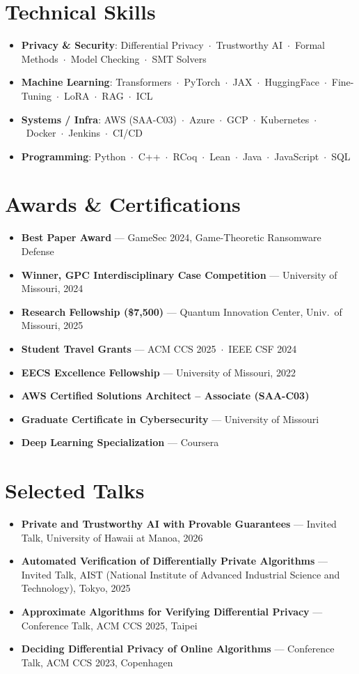 \documentclass[letterpaper,11pt]{article}
\newcommand{\plainListStart}{\begin{itemize}[leftmargin=0.15in, label={\small\textbullet}, itemsep=3pt, parsep=0pt, topsep=2pt]}
\newcommand{\plainListEnd}{\end{itemize}\vspace{1pt}}
\newcommand{\sep}{\ $\cdot$\ }
\begin{document}
\section{Technical Skills}
\plainListStart
  \small
  \item \textbf{Privacy \& Security}: Differential Privacy\sep Trustworthy AI\sep Formal Methods\sep Model Checking\sep SMT Solvers
  \item \textbf{Machine Learning}: Transformers\sep PyTorch\sep JAX\sep HuggingFace\sep Fine-Tuning\sep LoRA\sep RAG\sep ICL
  \item \textbf{Systems / Infra}: AWS (SAA-C03)\sep Azure\sep GCP\sep Kubernetes\sep Docker\sep Jenkins\sep CI/CD
  \item \textbf{Programming}: Python\sep C++\sep RCoq\sep Lean\sep Java\sep JavaScript\sep SQL
\plainListEnd

\section{Awards \& Certifications}
\plainListStart
  \small
  \item \textbf{Best Paper Award} --- GameSec 2024, Game-Theoretic Ransomware Defense
  \item \textbf{Winner, GPC Interdisciplinary Case Competition} --- University of Missouri, 2024
  \item \textbf{Research Fellowship (\$7,500)} --- Quantum Innovation Center, Univ.\ of Missouri, 2025
  \item \textbf{Student Travel Grants} --- ACM CCS 2025\sep IEEE CSF 2024
  \item \textbf{EECS Excellence Fellowship} --- University of Missouri, 2022
  \item \textbf{AWS Certified Solutions Architect -- Associate (SAA-C03)}
  \item \textbf{Graduate Certificate in Cybersecurity} --- University of Missouri
  \item \textbf{Deep Learning Specialization} --- Coursera
\plainListEnd

\section{Selected Talks}
\plainListStart
  \small
  \item \textbf{Private and Trustworthy AI with Provable Guarantees} --- Invited Talk, University of Hawaii at Manoa, 2026
  \item \textbf{Automated Verification of Differentially Private Algorithms} --- Invited Talk, AIST (National Institute of Advanced Industrial Science and Technology), Tokyo, 2025
  \item \textbf{Approximate Algorithms for Verifying Differential Privacy} --- Conference Talk, ACM CCS 2025, Taipei
  \item \textbf{Deciding Differential Privacy of Online Algorithms} --- Conference Talk, ACM CCS 2023, Copenhagen
\plainListEnd
\end{document}
